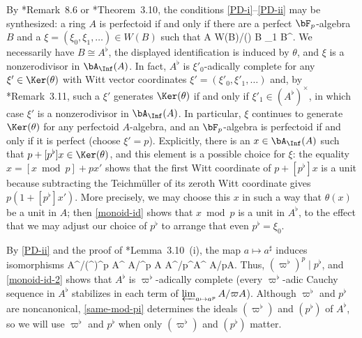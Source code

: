By \cite{Lau18}*{Remark~8.6} or \cite{BS19}*{Theorem~3.10}, the conditions \ref{PD-i}--\ref{PD-ii} may be synthesized: a ring $A$ is perfectoid if and only if there are a perfect $\bF_p$-algebra $B$ and a $\xi = (\xi_0, \xi_1,  \dotsc) \in W(B)$ such that %
\be \label{alt-def}
A  \simeq W(B)/(\xi)  B  \xi_1 \in B^\times.
\ee
We necessarily have $B \cong A^\flat$, the displayed identification is induced by $\theta$, and $\xi$ is a nonzerodivisor in $\bA_\Inf(A)$. In fact, $A^\flat$ is $\xi'_0$-adically complete for any $\xi' \in \Ker(\theta)$ with Witt vector coordinates $\xi' = (\xi'_0, \xi'_1, \dotsc)$ and, by \cite{BMS18}*{Remark~3.11}, such a $\xi'$ generates $\Ker(\theta)$ if and only if $\xi'_1 \in (A^\flat)^\times$, in which case $\xi'$ is a  nonzerodivisor in $\bA_\Inf(A)$.  In particular, $\xi$ continues to generate $\Ker(\theta)$ for any perfectoid $A$-algebra, and an $\bF_p$-algebra is perfectoid if and only if it is perfect (choose $\xi' = p$). Explicitly, there is an $x \in \bA_\Inf(A)$ such that $p + [p^\flat]x \in \Ker(\theta)$, and this element is a possible choice for $\xi$: the equality $x = [x \bmod p] + px'$ shows that the first Witt coordinate of $p + [p^\flat]x$ is a unit because subtracting the Teichm\"{u}ller of its zeroth Witt coordinate gives $p(1 + [p^\flat]x')$. More precisely, we may choose this  $x$ in such a way that $\theta(x)$ be a unit in $A$; then \eqref{monoid-id} shows that $x \bmod p$ is a unit in $A^\flat$, to the effect that we may adjust our choice of $p^\flat$ to arrange that even $p^\flat = \xi_0$.





By \ref{PD-ii} and the proof of \cite{BMS18}*{Lemma~3.10~(i)}, the map $a \mapsto a^\sharp$ induces isomorphisms
\be \label{same-mod-pi}
A^\flat/(\varpi^\flat)^p A^\flat \isomto %
A/\varpi^p A    A^\flat/p^\flat A^\flat \isomto %
A/pA.
\ee
Thus, $(\varpi^\flat)^p \mid p^\flat$, and \eqref{monoid-id-2} shows that $A^\flat$ is $\varpi^\flat$-adically complete (every $\varpi^\flat$-adic Cauchy sequence in $A^\flat$ stabilizes in each term of $\varprojlim_{a \mapsto a^p} A/\varpi A$).
Although $\varpi^\flat$ and $p^\flat$ are noncanonical, \eqref{same-mod-pi} determines the ideals $(\varpi^\flat)$ and $(p^\flat)$ of $A^\flat$, so we will use $\varpi^\flat$ and $p^\flat$ when only $(\varpi^\flat)$ and $(p^\flat)$ matter.

